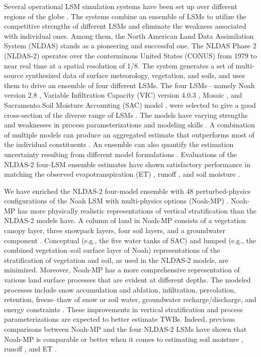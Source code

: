\documentclass[essd, manuscript]{copernicus}
\begin{document}
Several operational LSM simulation systems have been set up over different regions of the globe \citep{xia2019JMR, shi2011SCES, carrera2015JH, rodell2004BAMS}. The systems combine an ensemble of LSMs to utilize the competitive strengths of different LSMs and eliminate the weakness associated with individual ones. Among them, the North American Land Data Assimilation System (NLDAS) \citep{xia2012JGRAa, xia2012JGRA, mitchell2004JGRA} stands as a pioneering and successful one. The NLDAS Phase 2 (NLDAS-2) operates over the conterminous United States (CONUS) from 1979 to near real time at a spatial resolution of 1/8\degree{}. The system generates a set of multi-source synthesized data of surface meteorology, vegetation, and soils, and uses them to drive an ensemble of four different LSMs. The four LSMs---namely Noah version 2.8 \citep{ek2003JGRA, chen2001MWR, chen2001MWRa, chen1997BM}, Variable Infiltration Capacity (VIC) version 4.0.3 \citep{liang1994JGRA}, Mosaic \citep{koster1992JGRA}, and Sacramento Soil Moisture Accounting (SAC) model \citep{burnash1973}, were selected to give a good cross-section of the diverse range of LSMs \citep{mitchell2004JGRA}. The models have varying strengths and weaknesses in process parameterizations and modeling skills \citep{kumar2017WRR}. A combination of multiple models can produce an aggregated estimate that outperforms most of the individual constituents \citep{fei2021WRR, beck2017HESS, guo2007QJRMS, ajami2007WRR}. An ensemble can also quantify the estimation uncertainty resulting from different model formulations \citep{troin2021WRR, cloke2009JH}. Evaluations of the NLDAS-2 four-LSM ensemble estimates have shown satisfactory performance in matching the observed evapotranspiration (ET) \citep{zhang2020AFM, xia2012JGRA, kumar2018RS}, runoff \citep{xia2012JGRAa}, and soil moisture \citep{xia2015JHa, xia2015JH}.

We have enriched the NLDAS-2 four-model ensemble with 48 perturbed-physics configurations of the Noah LSM with multi-physics options (Noah-MP) \citep{fei2021WRR, zheng2020JAMES, zheng2019WRR}. Noah-MP has more physically realistic representations of vertical stratification than the NLDAS-2 models have. A column of land in Noah-MP consists of a vegetation canopy layer, three snowpack layers, four soil layers, and a groundwater component \citep{niu2011JGRA, yang2011JGRA}. Conceptual (e.g., the five water tanks of SAC) and lumped (e.g., the combined vegetation--soil surface layer of Noah) representations of the stratification of vegetation and soil, as used in the NLDAS-2 models, are minimized. Moreover, Noah-MP has a more comprehensive representation of various land surface processes that are evident at different depths. The modeled processes include snow accumulation and ablation, infiltration, percolation, retention, freeze--thaw of snow or soil water, groundwater recharge/discharge, and energy constraints \citep{niu2011JGRA}. These improvements in vertical stratification and process parameterizations are expected to better estimate TWBs. Indeed, previous comparisons between Noah-MP and the four NLDAS-2 LSMs have shown that Noah-MP is comparable or better when it comes to estimating soil moisture \citep{cai2014JGRAa}, runoff \citep{cai2014JGRA, fei2021WRR}, and ET \citep{zhang2020AFM}.
\end{document}
